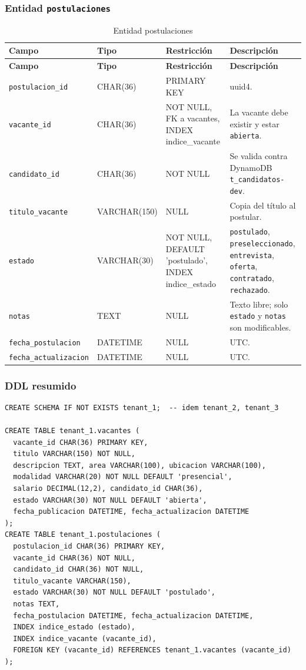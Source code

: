 \subsubsection{Entidad \texttt{postulaciones}}
\begin{longtable}{p{3cm}p{2.7cm}p{3.6cm}p{4.7cm}}
\caption{Entidad postulaciones}\\
\toprule
\textbf{Campo} & \textbf{Tipo} & \textbf{Restricción} & \textbf{Descripción} \\
\midrule
\endfirsthead
\toprule
\textbf{Campo} & \textbf{Tipo} & \textbf{Restricción} & \textbf{Descripción} \\
\midrule
\endhead
\bottomrule
\endlastfoot
\texttt{postulacion\_\allowbreak{}id} & CHAR(36) & PRIMARY KEY & uuid4. \\
\texttt{vacante\_\allowbreak{}id} & CHAR(36) & NOT NULL, FK a vacantes, INDEX indice\_vacante & La vacante debe existir y estar \texttt{abierta}. \\
\texttt{candidato\_\allowbreak{}id} & CHAR(36) & NOT NULL & Se valida contra DynamoDB \texttt{t\_\allowbreak{}candidatos-\allowbreak{}dev}. \\
\texttt{titulo\_\allowbreak{}vacante} & VARCHAR(150) & NULL & Copia del título al postular. \\
\texttt{estado} & VARCHAR(30) & NOT NULL, DEFAULT 'postulado', INDEX indice\_estado & \texttt{postulado}, \texttt{preseleccionado}, \texttt{entrevista}, \texttt{oferta}, \texttt{contratado}, \texttt{rechazado}. \\
\texttt{notas} & TEXT & NULL & Texto libre; solo \texttt{estado} y \texttt{notas} son modificables. \\
\texttt{fecha\_\allowbreak{}postulacion} & DATETIME & NULL & UTC. \\
\texttt{fecha\_\allowbreak{}actualizacion} & DATETIME & NULL & UTC. \\
\end{longtable}

\subsubsection{DDL resumido}
\begin{lstlisting}
CREATE SCHEMA IF NOT EXISTS tenant_1;  -- idem tenant_2, tenant_3

CREATE TABLE tenant_1.vacantes (
  vacante_id CHAR(36) PRIMARY KEY,
  titulo VARCHAR(150) NOT NULL,
  descripcion TEXT, area VARCHAR(100), ubicacion VARCHAR(100),
  modalidad VARCHAR(20) NOT NULL DEFAULT 'presencial',
  salario DECIMAL(12,2), candidato_id CHAR(36),
  estado VARCHAR(30) NOT NULL DEFAULT 'abierta',
  fecha_publicacion DATETIME, fecha_actualizacion DATETIME
);
CREATE TABLE tenant_1.postulaciones (
  postulacion_id CHAR(36) PRIMARY KEY,
  vacante_id CHAR(36) NOT NULL,
  candidato_id CHAR(36) NOT NULL,
  titulo_vacante VARCHAR(150),
  estado VARCHAR(30) NOT NULL DEFAULT 'postulado',
  notas TEXT,
  fecha_postulacion DATETIME, fecha_actualizacion DATETIME,
  INDEX indice_estado (estado),
  INDEX indice_vacante (vacante_id),
  FOREIGN KEY (vacante_id) REFERENCES tenant_1.vacantes (vacante_id)
);
\end{lstlisting}

